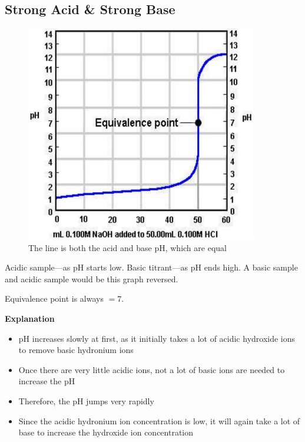\documentclass[a4paper,12pt]{article}
\begin{document}
\subsection{Strong Acid \& Strong Base}
\begin{figure}[H]
    \centering
    \includegraphics[width=0.9\textwidth]{strongacid-strongbase}
    \caption{The line is both the acid and base pH, which are equal}
\end{figure}
Acidic sample---as pH starts low. Basic titrant---as pH ends high. A basic sample and acidic sample would be this graph reversed.

Equivalence point is always $= 7$.

\textbf{Explanation}
\begin{itemize}
    \item{pH increases slowly at first, as it initially takes a lot of acidic hydroxide ions to remove basic hydronium ions}
    \item{Once there are very little acidic ions, not a lot of basic ions are needed to increase the pH}
    \item{Therefore, the pH jumps very rapidly}
    \item{Since the acidic hydronium ion concentration is low, it will again take a lot of base to increase the hydroxide ion concentration}
\end{itemize}
\end{document}
